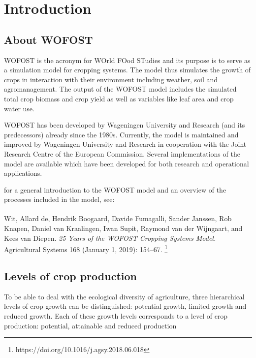
\chapter{Introduction} 

\section{About WOFOST}

WOFOST is the acronym for WOrld FOod STudies and its purpose is to serve as a
simulation model for cropping systems. The model thus simulates the growth of crops 
in interaction with their environment including weather, soil and agromanagement. 
The output of the WOFOST model includes the simulated total crop biomass and crop
yield as well as variables like leaf area and crop water use.

WOFOST has been developed by Wageningen University and Research (and its predecessors) 
already since the 1980s. Currently, the model is maintained and improved by Wageningen 
University and Research in cooperation with the Joint Research Centre of the European 
Commission. Several implementations of the model are available which have been
developed for both research and operational applications.

for a general introduction to the WOFOST model and an overview of the
processes included in the model, see:\\
\\
Wit, Allard de, Hendrik Boogaard, Davide Fumagalli, Sander Janssen, Rob Knapen, 
Daniel van Kraalingen, Iwan Supit, Raymond van der Wijngaart, and Kees van Diepen. 
\textit{25 Years of the WOFOST Cropping Systems Model.} Agricultural Systems 168 
(January 1, 2019): 154–67. \footnote{https://doi.org/10.1016/j.agsy.2018.06.018}


\section{Levels of crop production}

To be able to deal with the ecological diversity of agriculture, three hierarchical levels of 
crop growth can be distinguished: potential growth, limited growth and reduced growth. 
Each of these growth levels corresponds to a level of crop production: potential, attainable and 
reduced production

